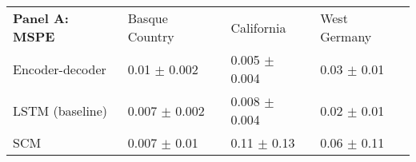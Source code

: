 \begin{tabular}{@{}llll@{}} %
\toprule
\textbf{Panel A: MSPE}                     & Basque Country & California 	& West Germany \\ 
Encoder-decoder                &   0.01 $\pm$   0.002	          &  	  \cellcolor{blue!25}0.005 $\pm$   0.004	&    0.03	 $\pm$  0.01	     \\ 
LSTM (baseline) 				 &      \cellcolor{blue!25}0.007 $\pm$  0.002        &    0.008 $\pm$ 0.004	    	&     \cellcolor{blue!25}0.02 	 $\pm$   0.01	      \\
SCM   		&  0.007 $\pm$ 0.01	          &   0.11 $\pm$  0.13     								& 	0.06 $\pm$   0.11 \\ 	
\end{tabular}
